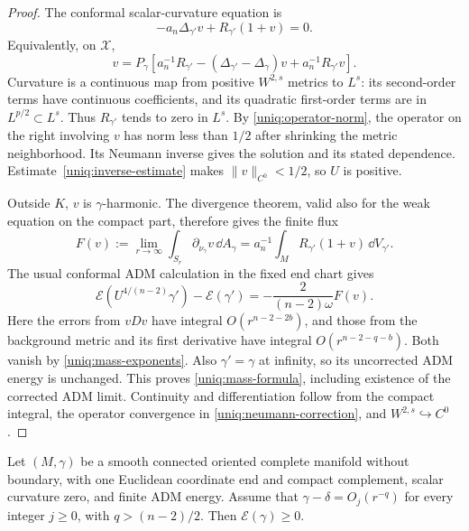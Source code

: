 \begin{proof}
The conformal scalar-curvature equation is
\[
 -a_n\Delta_{\gamma'}v+R_{\gamma'}(1+v)=0.
\]
Equivalently, on $\mathcal X$,
\begin{equation}\label{uniq:neumann-correction}
 v=P_\gamma\left[
 a_n^{-1}R_{\gamma'}
 -(\Delta_{\gamma'}-\Delta_\gamma)v
 +a_n^{-1}R_{\gamma'}v\right].
\end{equation}
Curvature is a continuous map from positive $W^{2,s}$ metrics to
$L^s$: its second-order terms have continuous coefficients, and
its quadratic first-order terms are in $L^{p/2}\subset L^s$.
Thus $R_{\gamma'}$ tends to zero in $L^s$. By
\eqref{uniq:operator-norm}, the operator on the right involving
$v$ has norm less than $1/2$ after shrinking the metric
neighborhood. Its Neumann inverse gives the solution and its stated
dependence. Estimate~\eqref{uniq:inverse-estimate} makes
$\|v\|_{C^0}<1/2$, so $U$ is positive.

Outside $K$, $v$ is $\gamma$-harmonic. The divergence theorem,
valid also for the weak equation on the compact part, therefore
gives the finite flux
\begin{equation}\label{uniq:correction-flux}
 F(v):=\lim_{r\to\infty}\int_{S_r}\partial_{\nu_\gamma}v
                 \,\dd A_\gamma
       =a_n^{-1}\int_M R_{\gamma'}(1+v)\,\dd V_{\gamma'}.
\end{equation}
The usual conformal ADM calculation in the fixed end chart gives
\[
 \mathcal E(U^{4/(n-2)}\gamma')-\mathcal E(\gamma')
       =-\frac{2}{(n-2)\omega}F(v).
\]
Here the errors from $vDv$ have integral
$O(r^{n-2-2b})$, and those from the background metric and its first
derivative have integral $O(r^{n-2-q-b})$. Both vanish by
\eqref{uniq:mass-exponents}. Also $\gamma'=\gamma$ at infinity,
so its uncorrected ADM energy is unchanged. This proves
\eqref{uniq:mass-formula}, including existence of the corrected
ADM limit. Continuity and differentiation follow from the compact
integral, the operator convergence in
\eqref{uniq:neumann-correction}, and $W^{2,s}\hookrightarrow C^0$.
\end{proof}

\begin{lemma}
\label{uniq:smooth-nonnegative-mass}
Let $(M,\gamma)$ be a smooth connected oriented complete manifold
without boundary, with one Euclidean coordinate end and compact
complement, scalar curvature zero, and finite ADM energy. Assume that $\gamma-\delta=O_j(r^{-q})$ for every integer $j\geq0$,
with $q>(n-2)/2$. Then $\mathcal E(\gamma)\geq0$.
\end{lemma}

